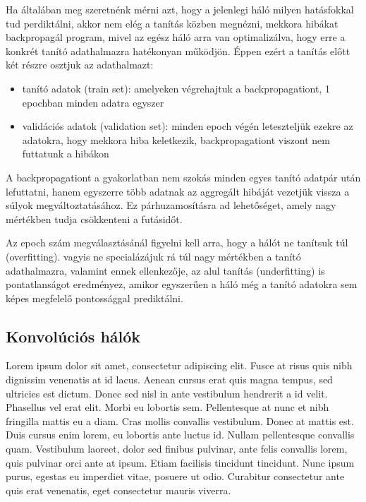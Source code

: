 \documentclass[12pt]{article}
\begin{document}
Ha általában meg szeretnénk mérni azt, hogy a jelenlegi háló milyen hatásfokkal tud perdiktálni, akkor nem elég a tanítás közben megnézni, mekkora hibákat backpropagál program, mivel az egész háló arra van optimalizálva, hogy erre a konkrét tanító adathalmazra hatékonyan működjön. Éppen ezért a tanítás előtt két részre osztjuk az adathalmazt:

\begin{itemize}  
	\item tanító adatok (train set): amelyeken végrehajtuk a backpropagationt, 1 epochban minden adatra egyszer
	\item validációs adatok (validation set): minden epoch végén leteszteljük ezekre az adatokra, hogy mekkora hiba keletkezik, backpropagationt viszont nem futtatunk a hibákon
\end{itemize}

A backpropagationt a gyakorlatban nem szokás minden egyes tanító adatpár után lefuttatni, hanem egyszerre több adatnak az aggregált hibáját vezetjük vissza a súlyok megváltoztatásához. Ez párhuzamosításra ad lehetőséget, amely nagy mértékben tudja csökkenteni a futásidőt.

Az epoch szám megválasztásánál figyelni kell arra, hogy a hálót ne tanítsuk túl (overfitting). vagyis ne specialázájuk rá túl nagy mértékben a tanító adathalmazra, valamint ennek ellenkezője, az alul tanítás (underfitting) is pontatlanságot eredményez, amikor egyszerűen a háló még a tanító adatokra sem képes megfelelő pontossággal prediktálni.

\subsection{Konvolúciós hálók}

Lorem ipsum dolor sit amet, consectetur adipiscing elit. Fusce at risus quis nibh dignissim venenatis at id lacus. Aenean cursus erat quis magna tempus, sed ultricies est dictum. Donec sed nisl in ante vestibulum hendrerit a id velit. Phasellus vel erat elit. Morbi eu lobortis sem. Pellentesque at nunc et nibh fringilla mattis eu a diam. Cras mollis convallis vestibulum. Donec at mattis est. Duis cursus enim lorem, eu lobortis ante luctus id. Nullam pellentesque convallis quam. Vestibulum laoreet, dolor sed finibus pulvinar, ante felis convallis lorem, quis pulvinar orci ante at ipsum. Etiam facilisis tincidunt tincidunt. Nunc ipsum purus, egestas eu imperdiet vitae, posuere ut odio. Curabitur consectetur ante quis erat venenatis, eget consectetur mauris viverra.
\end{document}
